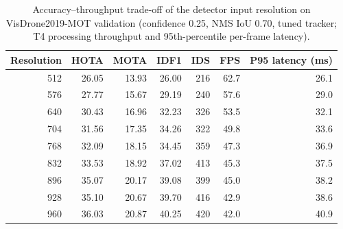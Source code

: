 \begin{table}[t]
\centering
\caption{Accuracy--throughput trade-off of the detector input resolution on VisDrone2019-MOT validation (confidence 0.25, NMS IoU 0.70, tuned tracker; T4 processing throughput and 95th-percentile per-frame latency).}
\label{tab:speed}
\small
\begin{tabular}{rrrrrrr}
\hline
Resolution & HOTA & MOTA & IDF1 & IDS & FPS & P95 latency (ms) \\
\hline
512 & 26.05 & 13.93 & 26.00 & 216 & 62.7 & 26.1 \\
576 & 27.77 & 15.67 & 29.19 & 240 & 57.6 & 29.0 \\
640 & 30.43 & 16.96 & 32.23 & 326 & 53.5 & 32.1 \\
704 & 31.56 & 17.35 & 34.26 & 322 & 49.8 & 33.6 \\
768 & 32.09 & 18.15 & 34.45 & 359 & 47.3 & 36.9 \\
832 & 33.53 & 18.92 & 37.02 & 413 & 45.3 & 37.5 \\
896 & 35.07 & 20.17 & 39.08 & 399 & 45.0 & 38.2 \\
928 & 35.10 & 20.67 & 39.70 & 416 & 42.9 & 38.6 \\
960 & 36.03 & 20.87 & 40.25 & 420 & 42.0 & 40.9 \\
\hline
\end{tabular}
\end{table}
